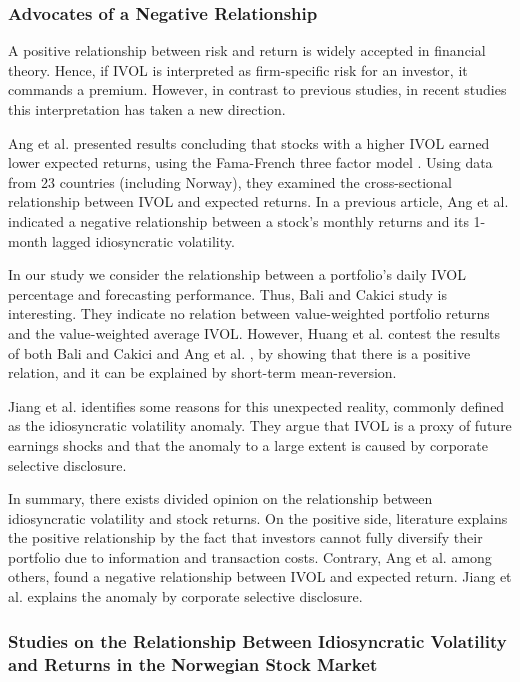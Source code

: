 \subsubsection{Advocates of a Negative Relationship}
A positive relationship between risk and return is widely accepted in financial theory. Hence, if IVOL is interpreted as firm-specific risk for an investor, it commands a premium. However, in contrast to previous studies, in recent studies this interpretation has taken a new direction.

Ang et al. \cite{angetal09} presented results concluding that stocks with a higher IVOL earned lower expected returns, using the Fama-French three factor model \cite{famafrench}. Using data from 23 countries (including Norway), they examined the cross-sectional relationship between IVOL and expected returns. In a previous article, Ang et al. \cite{angetal06} indicated a negative relationship between a stock's monthly returns and its 1-month lagged idiosyncratic volatility. 

In our study we consider the relationship between a portfolio's daily IVOL percentage and forecasting performance. Thus, Bali and Cakici \cite{balicakici06} study is interesting. They indicate no relation between value-weighted portfolio returns and the value-weighted average IVOL. However, Huang et al. \cite{huang} contest the results of both Bali and Cakici \cite{balicakici06} and Ang et al. \cite{angetal09}, by showing that there is a positive relation, and it can be explained by short-term mean-reversion.

Jiang et al. \cite{jiangetal} identifies some reasons for this unexpected reality, commonly defined as the idiosyncratic volatility anomaly. They argue that IVOL is a proxy of future earnings shocks and that the anomaly to a large extent is caused by corporate selective disclosure. 

In summary, there exists divided opinion on the relationship between idiosyncratic volatility and stock returns. On the positive side, literature explains the positive relationship by the fact that investors cannot fully diversify their portfolio due to information and transaction costs. Contrary, Ang et al. \cite{angetal06} among others, found a negative relationship between IVOL and expected return. Jiang et al. \cite{jiangetal} explains the anomaly by corporate selective disclosure.

\subsubsection{Studies on the Relationship Between Idiosyncratic Volatility and Returns in the Norwegian Stock Market}


